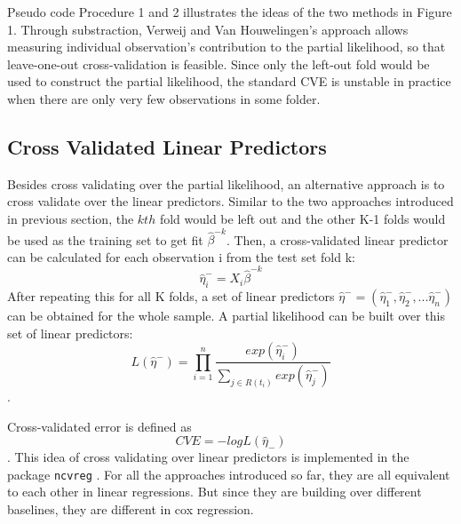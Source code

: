 \par Pseudo code Procedure 1 and 2 illustrates the ideas of the two methods in Figure 1. Through substraction, Verweij and Van Houwelingen's approach allows measuring individual observation's contribution to the partial likelihood, so that leave-one-out cross-validation is feasible. Since only the left-out fold would be used to construct the partial likelihood, the standard CVE is unstable in practice when there are only very few observations in some folder. 

  \subsection{Cross Validated Linear Predictors}

Besides cross validating over the partial likelihood, an alternative approach is to cross validate over the linear predictors. Similar to the two approaches introduced in previous section, the $kth$ fold would be left out and the other K-1 folds would be used as the training set to get fit $\hat{\beta}^{-k}$. Then, a cross-validated linear predictor can be calculated for each observation i from the test set fold k:  
	\begin{equation}
		\hat{\eta}^{-}_{i} = X_{i}\hat{\beta}^{-k} 
	\end{equation} 
After repeating this for all K folds, a set of linear predictors  $\hat{\eta}^{-} = ( \hat{\eta}^{-}_{1},  \hat{\eta}^{-}_{2} , ...  \hat{\eta}^{-}_{n})$ can be obtained for the whole sample. A partial likelihood can be built over this set of linear predictors: 
	\begin{equation} 
	L(\hat{\eta}^{-}) = \prod_{i=1}^{n} \frac{exp (\hat{\eta}^{-}_{i})}{\sum_{ j \in R(t_{i})}exp (\hat{\eta}^{-}_{j})}
	\end{equation}.

Cross-validated error is defined as $$ CVE = - log L(\hat{\eta}_{-})$$. 
This idea of cross validating over linear predictors is implemented in the package \texttt{ncvreg} \citep{ncvreg}. For all the approaches introduced so far, they are all equivalent to each other in linear regressions. But since they are building over different baselines, they are different in cox regression.

\par {}

